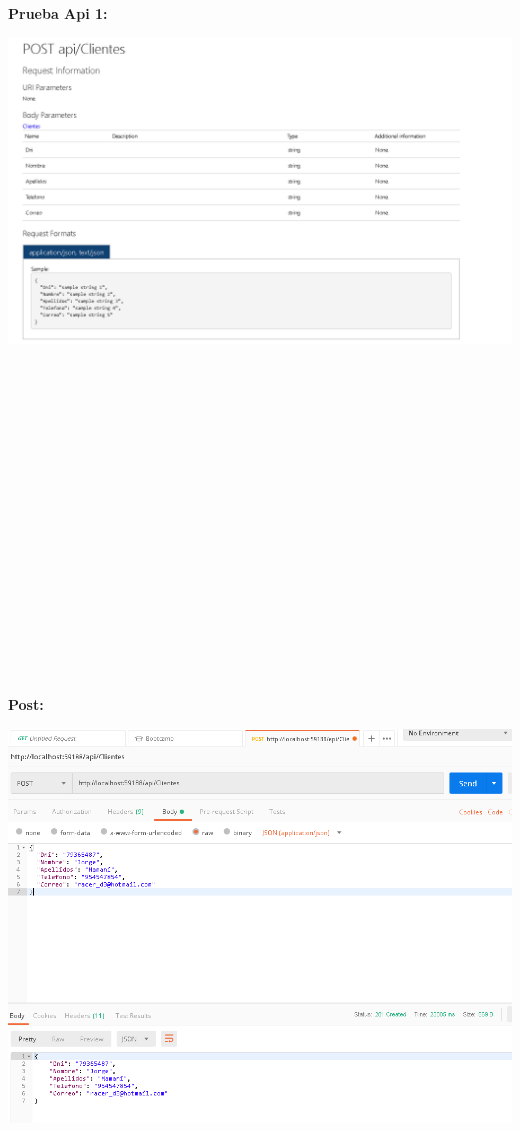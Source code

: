 \begin{flushleft}
\textbf{Prueba Api 1:}\\
\begin{center}
	\includegraphics[width=19cm]{./Imagenes/api1} 
	\end{center}
\textbf{}\\
\textbf{}\\
\textbf{}\\
\textbf{}\\
\textbf{}\\
\textbf{}\\
\textbf{}\\
\textbf{}\\
\textbf{}\\
\textbf{}\\
\textbf{}\\
\textbf{}\\
\textbf{}\\
\textbf{}\\
\textbf{}\\
\textbf{}\\
\textbf{}\\
\textbf{Post:}\\
\begin{center}
	\includegraphics[width=19cm]{./Imagenes/post1} 
	\end{center}
\textbf{}\\


\end{flushleft}
